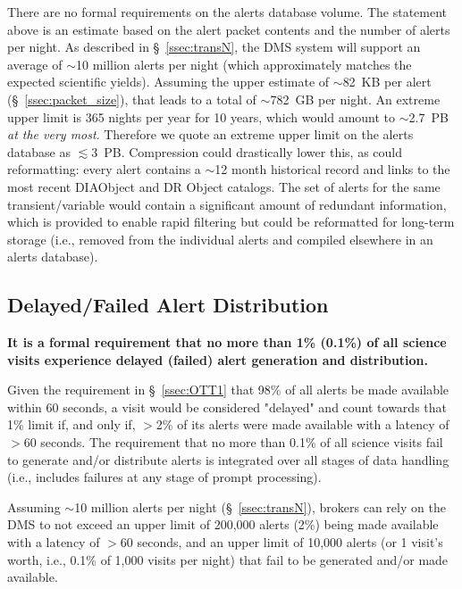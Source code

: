 \documentclass[DM,lsstdraft,authoryear,toc]{lsstdoc}
\begin{document}
There are no formal requirements on the alerts database volume. The statement above is an estimate based on the alert packet contents and the number of alerts per night. As described in \S~\ref{ssec:transN}, the DMS system will support an average of $\sim$10 million alerts per night (which approximately matches the expected scientific yields). Assuming the upper estimate of $\sim$82~KB per alert (\S~\ref{ssec:packet_size}), that leads to a total of $\sim$782~GB per night. An extreme upper limit is 365 nights per year for 10 years, which would amount to $\sim$2.7~PB {\it at the very most}. Therefore we quote an extreme upper limit on the alerts database as $\lesssim$3~PB. Compression could drastically lower this, as could reformatting: every alert contains a $\sim$12 month historical record and links to the most recent DIAObject and DR Object catalogs. The set of alerts for the same transient/variable would contain a significant amount of redundant information, which is provided to enable rapid filtering but could be reformatted for long-term storage (i.e., removed from the individual alerts and compiled elsewhere in an alerts database). 


\subsection{Delayed/Failed Alert Distribution}\label{ssec:OTR1}

{\bf It is a formal requirement that no more than 1\% (0.1\%) of all science visits experience delayed (failed) alert generation and distribution.}

Given the requirement in \S~\ref{ssec:OTT1} that 98\% of all alerts be made available within 60 seconds, a visit would be considered "delayed" and count towards that 1\% limit if, and only if, $>$2\% of its alerts were made available with a latency of $>$60 seconds. The requirement that no more than 0.1\% of all science visits fail to generate and/or distribute alerts is integrated over all stages of data handling (i.e., includes failures at any stage of prompt processing).

Assuming $\sim$10 million alerts per night (\S~\ref{ssec:transN}), brokers can rely on the DMS to not exceed an upper limit of 200,000 alerts (2\%) being made available with a latency of $>$60 seconds, and an upper limit of 10,000 alerts (or 1 visit's worth, i.e., 0.1\% of 1,000 visits per night) that fail to be generated and/or made available.
\end{document}
